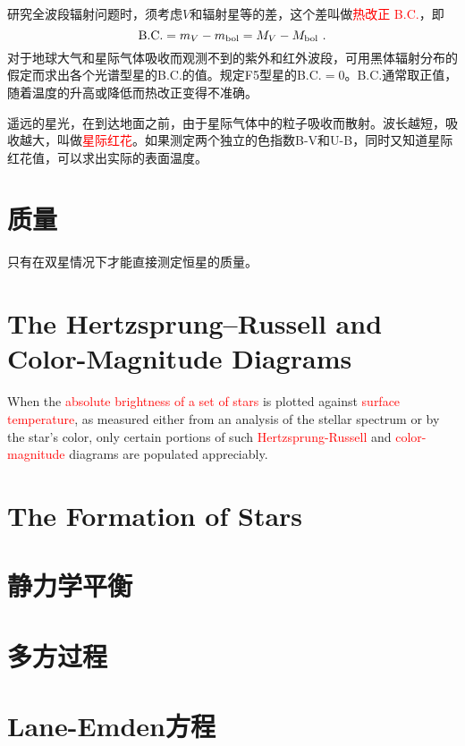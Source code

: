 \documentclass[12pt,a4paper]{article}
\begin{document}
研究全波段辐射问题时，须考虑$V$和辐射星等的差，这个差叫做\textcolor{red}{热改正 B.C.}，即
\begin{equation}
{\rm B.C.} = m_V - m_{\rm bol} = M_V - M_{\rm bol} ~.
\end{equation}
对于地球大气和星际气体吸收而观测不到的紫外和红外波段，可用黑体辐射分布的假定而求出各个光谱型星的B.C.的值。规定F5型星的B.C.$=0$。B.C.通常取正值，随着温度的升高或降低而热改正变得不准确。

遥远的星光，在到达地面之前，由于星际气体中的粒子吸收而散射。波长越短，吸收越大，叫做\textcolor{red}{星际红花}。如果测定两个独立的色指数B-V和U-B，同时又知道星际红花值，可以求出实际的表面温度。








\section{质量}
只有在双星情况下才能直接测定恒星的质量。

\section{The Hertzsprung–Russell and Color-Magnitude Diagrams}
When the \textcolor{red}{absolute brightness of a set of stars} is plotted against \textcolor{red}{surface temperature}, as measured either from an analysis of the stellar spectrum or by the star’s color, only certain portions of such \textcolor{red}{Hertzsprung-Russell} and \textcolor{red}{color-magnitude} diagrams are populated appreciably.







\section{The Formation of Stars}

\section{静力学平衡}



\section{多方过程}




\section{Lane-Emden方程}
\end{document}
